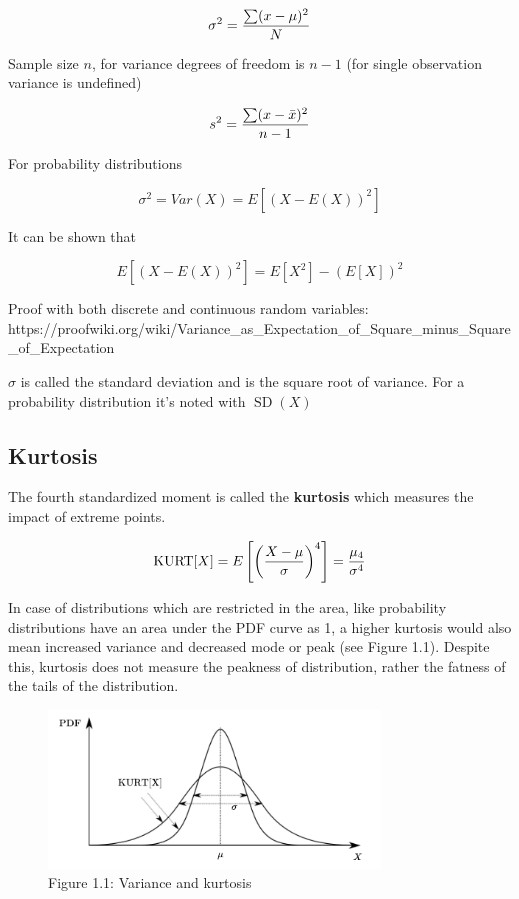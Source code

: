 \[\sigma^2={\sum(x-\mu)^2 \over N}\]

Sample size \(n\), for variance degrees of freedom is \(n-1\) (for single observation variance is undefined)

\[s^2={\sum(x-\bar x)^2 \over n-1}\]

For probability distributions

\[\sigma^2 = Var(X) = E[(X - E(X))^2]\]

It can be shown that

\[E[(X - E(X))^2] = E[X^2] - (E[X])^2\]

Proof with both discrete and continuous random variables:
https://proofwiki.org/wiki/Variance\_as\_Expectation\_of\_Square\_minus\_Square\_of\_Expectation

\(\sigma\) is called the standard deviation and is the square root of variance. For a probability distribution it's noted with \(\operatorname{SD}(X)\)

\subsection{Kurtosis}

The fourth standardized moment is called the \textbf{kurtosis} which measures the impact of extreme points.

\[\operatorname{KURT}[X] = E\left[ \left( X - \mu \over \sigma \right)^4 \right] = {\mu_4 \over \sigma ^ 4}\]

In case of distributions which are restricted in the area, like probability distributions have an area under the PDF curve as 1, a higher kurtosis would also mean increased variance and decreased mode or peak (see Figure 1.1). Despite this, kurtosis does not measure the peakness of distribution, rather the fatness of the tails of the distribution.


\begin{figure}[htbp]
    \begin{center}
        \includegraphics[width=250pt]{../img/01-moments.png}
        \caption{Figure 1.1: Variance and kurtosis}
    \end{center}
\end{figure}


